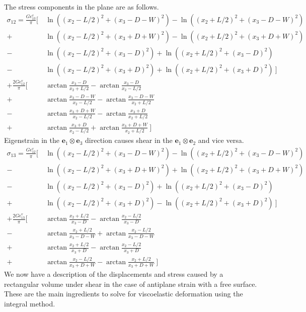 \documentclass[letterpaper,12pt,]{memoir}
\begin{document}
%
The stress components in the plane are as follows.
\begin{equation}
\begin{aligned}
\sigma_{12}=\frac{G\epsilon_{13}^v}{\pi}\bigg[~& 
    \ln  \left((x_2-L/2)^2+(x_3-D-W)^2\right)-\ln  \left((x_2+L/2)^2+(x_3-D-W)^2\right)\\
+&\ln  \left((x_2-L/2)^2+(x_3+D+W)^2\right)-\ln  \left((x_2+L/2)^2+(x_3+D+W)^2\right)\\
-&\ln  \left((x_2-L/2)^2+(x_3-D)^2\right)+\ln  \left((x_2+L/2)^2+(x_3-D)^2\right)\\
-&\ln  \left((x_2-L/2)^2+(x_3+D)^2\right)+\ln  \left((x_2+L/2)^2+(x_3+D)^2\right)~\bigg]\\
+\frac{2G\epsilon_{12}^v}{\pi}\bigg[~&
\arctan \frac {x_3-D}{x_2+L/2}-\arctan\frac {x_3-D}{x_2-L/2}\\
+&\arctan\frac {x_3-D-W}{x_2-L/2} -\arctan\frac {x_3-D-W}{x_2+L/2}\\
-&\arctan\frac {x_3+D+W}{x_2-L/2}-\arctan\frac {x_3+D}{x_2+L/2}\\
+&\arctan\frac {x_3+D}{x_2-L/2}+\arctan\frac {x_3+D+W}{x_2+L/2}~\bigg]
\end{aligned}
\end{equation}
Eigenstrain in the $\textbf{e}_1\otimes\textbf{e}_3$ direction causes shear in the $\textbf{e}_1\otimes\textbf{e}_2$ and vice versa. 
\begin{equation}
\begin{aligned}
\sigma_{13}=\frac{G\epsilon_{12}^v}{\pi}\bigg[~& 
\ln  \left((x_2-L/2)^2+(x_3-D-W)^2\right)-\ln  \left((x_2+L/2)^2+(x_3-D-W)^2\right)\\
  -&\ln  \left((x_2-L/2)^2+(x_3+D+W)^2\right)+\ln  \left((x_2+L/2)^2+(x_3+D+W)^2\right)\\
  -&\ln  \left((x_2-L/2)^2+(x_3-D)^2\right)+\ln  \left((x_2+L/2)^2+(x_3-D)^2\right)\\
+&\ln  \left((x_2-L/2)^2+(x_3+D)^2\right)-\ln  \left((x_2+L/2)^2+(x_3+D)^2\right)~\bigg]\\
+\frac{2G\epsilon_{13}^v}{\pi}\bigg[~&
 \arctan\frac {x_2+L/2}{x_3-D}-\arctan\frac {x_2-L/2}{x_3-D}\\
-&\arctan\frac {x_2+L/2}{x_3-D-W}+\arctan\frac {x_2-L/2}{x_3-D-W}\\
+&\arctan\frac {x_2+L/2}{x_3+D}-\arctan\frac {x_2-L/2}{x_3+D}  \\
+&\arctan \frac {x_2-L/2}{x_3+D+W}-\arctan\frac {x_2+L/2}{x_3+D+W}~\bigg]
\end{aligned}
\end{equation}
%
We now have a description of the displacements and stress caused by a rectangular volume under shear in the case of antiplane strain with a free surface. These are the main ingredients to solve for viscoelastic deformation using the integral method.
\end{document}
